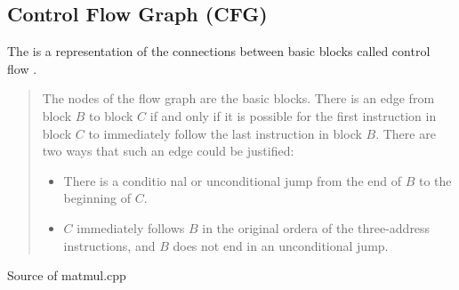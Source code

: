 \subsection{Control Flow Graph (CFG)}\label{subsec:cfg}
The \cfg is a representation of the connections between basic blocks called control flow \cite[chapter 8.4.3, p.~529]{Drachenbuch}.

\begin{quote}
    The nodes of the flow graph are the basic blocks.
    There is an edge from block \(B\) to block \(C\) if and only if it is possible for the first instruction in block \(C\) to immediately follow the last instruction in block \(B\).
    There are two ways that such an edge could be justified:
    \begin{itemize}
        \item There is a conditio nal or unconditional jump from the end of \(B\) to the beginning of \(C\).
        \item \(C\) immediately follows \(B\) in the original ordera of the three-address instructions, and \(B\) does not end in an unconditional jump.
    \end{itemize}
\end{quote}
\begin{code}
    \caption{Source of matmul.cpp}
    \inputminted{c++}{cpp/matmul.cpp}
    \label{lst:matmulcpp}
\end{code}

